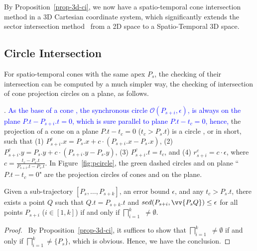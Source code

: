 By Proposition~\ref{prop-3d-ci}, we now have a spatio-temporal cone intersection method in a 3D Cartesian coordinate system, which significantly extends the sector intersection method~\cite{Williams:Longest, Sklansky:Cone, Zhao:Sleeve} {from a 2D space to a Spatio-Temporal 3D space}.






\subsection{Circle Intersection}
\label{subsec-ProjectionCircle}

For spatio-temporal cones with the same apex $P_s$, the checking of their intersection can be computed by a much simpler way, \ie the checking of intersection of cone projection circles on a plane, as follows.

.
\textcolor{blue}{As the base of a cone , \ie the synchronous circle $\mathcal{O}(P_{s+i}, \epsilon)$, is always on the plane $P.t-P_{s+i}.t = 0$, which is sure parallel to plane $P.t- t_c = 0$, hence,} the projection of a cone  on a plane $P.t- t_c = 0$ ($t_c > P_s.t$) is a circle , or  in short, such that
%
(1) $P^c_{s+i}.x = P_s.x +  c\cdot(P_{s+i}.x- P_{s}.x)$,
%
(2) $P^c_{s+i}.y = P_s.y +  c\cdot(P_{s+i}.y- P_{s}.y)$,
%
(3) $P^c_{s+i}.t = t_c$, and
%
(4) $r^c_{s+i} =c\cdot\epsilon$, where $c=\frac{t_c - P_s.t}{P_{s+i}.t - P_s.t}$.
In Figure~\ref{fig:pcircle}, the green dashed circles  and  on plane ``$P.t-t_{c}=0$" are the projection circles of cones  and  on the plane.




\begin{prop}
\label{prop-circle-intersection}
Given a sub-trajectory $[P_s,\ldots, P_{s+k}]$, an error bound $\epsilon$, and any $t_c > P_s.t$, there exists a point $Q$ such that $Q.t = P_{s+k}.t$ and $sed(P_{s+i}, \vv{P_sQ})\le \epsilon$ for all points $P_{s+i}$ ($i \in [1,k]$) if and only if $\bigsqcap_{i=1}^{k}$ $\ne \emptyset$.
\end{prop}


\begin{proof}\
By Proposition~\ref{prop-3d-ci}, it suffices to show that $\bigsqcap_{i=1}^{k}$  $\ne \emptyset$ if and only if $\bigsqcap_{i=1}^{k}$$\ne \{P_s\}$, which is obvious. Hence, we have the conclusion. \eop
\end{proof}

